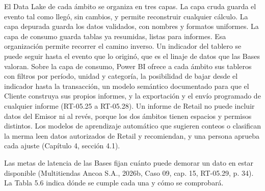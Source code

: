 \documentclass[11pt]{article}
\begin{document}
El Data Lake de cada ámbito se organiza en tres capas. La capa cruda guarda el evento tal como llegó, sin cambios, y permite reconstruir cualquier cálculo. La capa depurada guarda los datos validados, con nombres y formatos uniformes. La capa de consumo guarda tablas ya resumidas, listas para informes. Esa organización permite recorrer el camino inverso. Un indicador del tablero se puede seguir hasta el evento que lo originó, que es el linaje de datos que las Bases valoran. Sobre la capa de consumo, Power BI ofrece a cada ámbito sus tableros con filtros por período, unidad y categoría, la posibilidad de bajar desde el indicador hasta la transacción, un modelo semántico documentado para que el Cliente construya sus propios informes, y la exportación y el envío programado de cualquier informe (RT-05.25 a RT-05.28). Un informe de Retail no puede incluir datos del Emisor ni al revés, porque los dos ámbitos tienen espacios y permisos distintos. Los modelos de aprendizaje automático que sugieren conteos o clasifican la merma leen datos autorizados de Retail y recomiendan, y una persona aprueba cada ajuste (Capítulo 4, sección 4.1).

Las metas de latencia de las Bases fijan cuánto puede demorar un dato en estar disponible (Multitiendas Ancoa S.A., 2026b, Caso 09, cap. 15, RT-05.29, p. 34). La Tabla 5.6 indica dónde se cumple cada una y cómo se comprobará.
\end{document}
